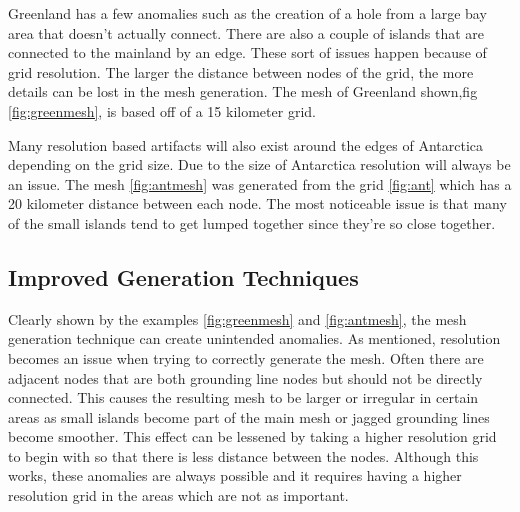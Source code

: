 Greenland has a few anomalies such as the creation of a hole from a large bay area that doesn't actually connect.  There are also a couple of islands that are connected to the mainland by an edge.  These sort of issues happen because of grid resolution.  The larger the distance between nodes of the grid, the more details can be lost in the mesh generation.  The mesh of Greenland shown,fig \ref{fig:greenmesh}, is based off of a 15 kilometer grid.


Many resolution based artifacts will also exist around the edges of Antarctica depending on the grid size.  Due to the size of Antarctica resolution will always be an issue.  The mesh \ref{fig:antmesh} was generated from the grid \ref{fig:ant} which has a 20 kilometer distance between each node.  The most noticeable issue is that many of the small islands tend to get lumped together since they're so close together.  





\subsection{Improved Generation Techniques}

Clearly shown by the examples \ref{fig:greenmesh} and \ref{fig:antmesh}, the mesh generation technique can create unintended anomalies.  As mentioned, resolution becomes an issue when trying to correctly generate the mesh. Often there are adjacent nodes that are both grounding line nodes but should not be directly connected.  This causes the resulting mesh to be larger or irregular in certain areas as small islands become part of the main mesh or jagged grounding lines become smoother.  This effect can be lessened by taking a higher resolution grid to begin with so that there is less distance between the nodes.  Although this works, these anomalies are always possible and it requires having a higher resolution grid in the areas which are not as important.


